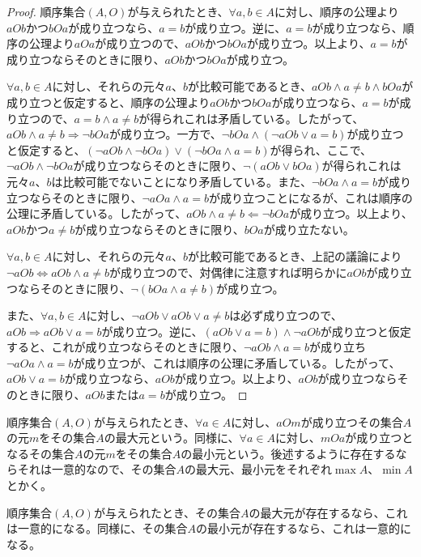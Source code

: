 \documentclass[dvipdfmx]{jsarticle}
\begin{document}
\begin{proof}
順序集合$(A,O)$が与えられたとき、$\forall a,b \in A$に対し、順序の公理より$aOb$かつ$bOa$が成り立つなら、$a = b$が成り立つ。逆に、$a = b$が成り立つなら、順序の公理より$aOa$が成り立つので、$aOb$かつ$bOa$が成り立つ。以上より、$a = b$が成り立つならそのときに限り、$aOb$かつ$bOa$が成り立つ。\par
$\forall a,b \in A$に対し、それらの元々$a$、$b$が比較可能であるとき、$aOb \land a \neq b \land bOa$が成り立つと仮定すると、順序の公理より$aOb$かつ$bOa$が成り立つなら、$a = b$が成り立つので、$a = b \land a \neq b$が得られこれは矛盾している。したがって、$aOb \land a \neq b \Rightarrow \neg bOa$が成り立つ。一方で、$\neg bOa \land (\neg aOb \vee a = b)$が成り立つと仮定すると、$(\neg aOb \land \neg bOa) \vee (\neg bOa \land a = b)$が得られ、ここで、$\neg aOb \land \neg bOa$が成り立つならそのときに限り、$\neg(aOb \vee bOa)$が得られこれは元々$a$、$b$は比較可能でないことになり矛盾している。また、$\neg bOa \land a = b$が成り立つならそのときに限り、$\neg aOa \land a = b$が成り立つことになるが、これは順序の公理に矛盾している。したがって、$aOb \land a \neq b \Leftarrow \neg bOa$が成り立つ。以上より、$aOb$かつ$a \neq b$が成り立つならそのときに限り、$bOa$が成り立たない。\par
$\forall a,b \in A$に対し、それらの元々$a$、$b$が比較可能であるとき、上記の議論により$\neg aOb \Leftrightarrow aOb \land a \neq b$が成り立つので、対偶律に注意すれば明らかに$aOb$が成り立つならそのときに限り、$\neg(bOa \land a \neq b)$が成り立つ。\par
また、$\forall a,b \in A$に対し、$\neg aOb \vee aOb \vee a \neq b$は必ず成り立つので、$aOb \Rightarrow aOb \vee a = b$が成り立つ。逆に、$(aOb \vee a = b) \land \neg aOb$が成り立つと仮定すると、これが成り立つならそのときに限り、$\neg aOb \land a = b$が成り立ち$\neg aOa \land a = b$が成り立つが、これは順序の公理に矛盾している。したがって、$aOb \vee a = b$が成り立つなら、$aOb$が成り立つ。以上より、$aOb$が成り立つならそのときに限り、$aOb$または$a = b$が成り立つ。
\end{proof}
\begin{dfn}
順序集合$(A,O)$が与えられたとき、$\forall a \in A$に対し、$aOm$が成り立つその集合$A$の元$m$をその集合$A$の最大元という。同様に、$\forall a \in A$に対し、$mOa$が成り立つとなるその集合$A$の元$m$をその集合$A$の最小元という。後述するように存在するならそれは一意的なので、その集合$A$の最大元、最小元をそれぞれ$\max A$、$\min A$とかく。
\end{dfn}
\begin{thm}\label{1.3.1.3}
順序集合$(A,O)$が与えられたとき、その集合$A$の最大元が存在するなら、これは一意的になる。同様に、その集合$A$の最小元が存在するなら、これは一意的になる。
\end{thm}\par
\end{document}
